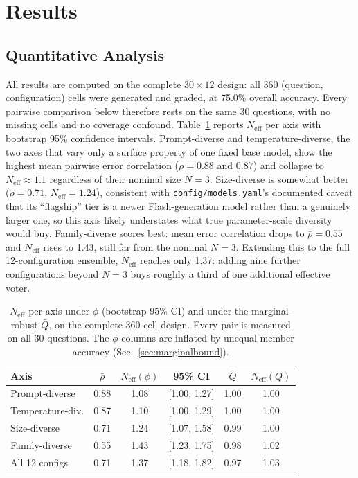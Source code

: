 \documentclass[conference]{IEEEtran}
\begin{document}
\FloatBarrier

\section{Results}
\label{sec:results}

\subsection{Quantitative Analysis}
All results are computed on the complete $30\times12$ design: all 360
(question, configuration) cells were generated and graded, at 75.0\% overall
accuracy. Every pairwise comparison below therefore rests on the same 30
questions, with no missing cells and no coverage confound. Table~\ref{tab:neff}
reports $N_\text{eff}$ per axis with bootstrap 95\% confidence intervals.
Prompt-diverse and temperature-diverse, the two axes that vary only a
surface property of one fixed base model, show the highest mean pairwise
error correlation ($\bar\rho=0.88$ and $0.87$) and collapse to
$N_\text{eff}\approx 1.1$ regardless of their nominal size $N=3$.
Size-diverse is somewhat better ($\bar\rho=0.71$, $N_\text{eff}=1.24$),
consistent with \texttt{config/models.yaml}'s documented caveat that its
``flagship'' tier is a newer Flash-generation model rather than a genuinely
larger one, so this axis likely understates what true parameter-scale
diversity would buy. Family-diverse scores best: mean error correlation
drops to $\bar\rho=0.55$ and $N_\text{eff}$ rises to 1.43, still far from the
nominal $N=3$. Extending this to the full 12-configuration ensemble,
$N_\text{eff}$ reaches only 1.37: adding nine further configurations beyond
$N=3$ buys roughly a third of one additional effective voter.

\begin{table}[!htb]
\centering
\caption{$N_\text{eff}$ per axis under $\phi$ (bootstrap 95\% CI) and under the marginal-robust $\bar{Q}$, on the complete 360-cell design. Every pair is measured on all 30 questions. The $\phi$ columns are inflated by unequal member accuracy (Sec.~\ref{sec:marginalbound}).}
\label{tab:neff}
\begin{tabular}{lccccc}
\toprule
Axis & $\bar\rho$ & $N_\text{eff}(\phi)$ & 95\% CI & $\bar{Q}$ & $N_\text{eff}(Q)$ \\
\midrule
Prompt-diverse & 0.88 & 1.08 & [1.00, 1.27] & 1.00 & 1.00 \\
Temperature-div. & 0.87 & 1.10 & [1.00, 1.29] & 1.00 & 1.00 \\
Size-diverse & 0.71 & 1.24 & [1.07, 1.58] & 0.99 & 1.00 \\
Family-diverse & 0.55 & 1.43 & [1.23, 1.75] & 0.98 & 1.02 \\
\midrule
All 12 configs & 0.71 & 1.37 & [1.18, 1.82] & 0.97 & 1.03 \\
\bottomrule
\end{tabular}
\end{table}
\end{document}
